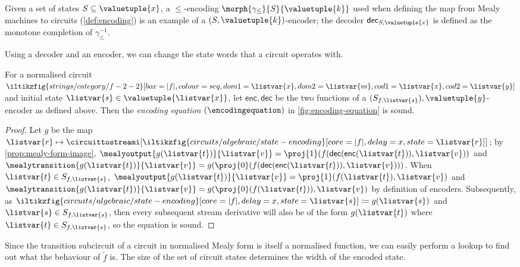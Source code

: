 \begin{example}
    Given a set of states \(S \subseteq \valuetuple{x}\), a \(\leq\)-encoding
    \(\morph{\gamma_\leq}{S}{\valuetuple{k}}\) used when defining the map from
    Mealy machines to circuits (\cref{def:encoding}) is an example of a
    \((S,\valuetuple{k})\)-encoder; the decoder
    \(\mathsf{dec}_{S,\valuetuple{x}}\) is defined as the monotone completion
    of \(\gamma_\leq^{-1}\).
\end{example}

Using a decoder and an encoder, we can change the state words that a circuit
operates with.

\begin{proposition}\label{prop:encoding-equation}
    For a normalised circuit \(
    \iltikzfig{strings/category/f-2-2}[box=|f|,colour=seq,dom1=\listvar{x},dom2=\listvar{m},cod1=\listvar{x},cod2=\listvar{y}]
    \) and initial state \(\listvar{s} \in \valuetuple{\listvar{x}}\), let
    \(\mathsf{enc},\mathsf{dec}\) be the two functions of a
    \((S_{f,\listvar{s}}),\valuetuple{y}\)-encoder as defined above.
    Then the \emph{encoding equation} \((\encodingequation)\) in
    \cref{fig:encoding-equation} is sound.
\end{proposition}
\begin{proof}
    Let \(g\) be the map \(\listvar{r} \mapsto
    \circuittostreami[\iltikzfig{circuits/algebraic/state-encoding}[core=|f|,delay=x,state=\listvar{r}]]
    \); by \cref{prop:mealy-form-image}, \(
    \mealyoutput{g(\listvar{t})}{\listvar{v}}
    =
    \proj{1}(f(\mathsf{dec}(\mathsf{enc}(\listvar{t})), \listvar{v}))
    \) and \(
    \mealytransition{g(\listvar{t})}{\listvar{v}}
    =
    g(\proj{0}(f(\mathsf{dec}(\mathsf{enc}(\listvar{t})), \listvar{v})))
    \).
    When \(\listvar{t} \in S_{f, \listvar{s}}\), \(
    \mealyoutput{g(\listvar{t})}{\listvar{v}}
    =
    \proj{1}(f(\listvar{t}), \listvar{v})
    \) and \(
    \mealytransition{g(\listvar{t})}{\listvar{v}}
    =
    g(\proj{0}(f(\listvar{t})), \listvar{v})
    \) by definition of encoders.
    Subsequently, as \(
    \iltikzfig{circuits/algebraic/state-encoding}[core=|f|,delay=x,state=\listvar{s}]
    \coloneqq
    g(\listvar{s})
    \) and \(\listvar{s} \in S_{f,\listvar{s}}\),
    then every subsequent stream derivative will also be of the form
    \(g(\listvar{t})\) where \(\listvar{t} \in S_{f,\listvar{s}}\), so the
    equation is sound.
\end{proof}

Since the transition subcircuit of a circuit in normalised Mealy form is itself
a normalised function, we can easily perform a lookup to find out what the
behaviour of \(\tilde{f}\) is.
The size of the set of circuit states determines the width of the encoded state.

